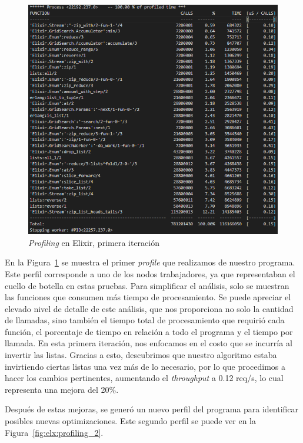 \documentclass[11pt]{article}
\newcommand{\english}[1]{\textit{#1}}
\begin{document}
\begin{figure}[ht]
    \centering
    \includegraphics[scale=0.4]{resources/distributed_systems/elixir/1.png}
    \caption{\english{Profiling} en Elixir, primera iteración}
    \label{fig:elx:profiling_1}
\end{figure}

En la Figura~\ref{fig:elx:profiling_1} se muestra el primer \english{profile} que realizamos de nuestro programa. Este perfil corresponde a uno de los nodos trabajadores, ya que representaban el cuello de botella en estas pruebas. Para simplificar el análisis, solo se muestran las funciones que consumen más tiempo de procesamiento. Se puede apreciar el elevado nivel de detalle de este análisis, que nos proporciona no solo la cantidad de llamadas, sino también el tiempo total de procesamiento que requirió cada función, el porcentaje de tiempo en relación a todo el programa y el tiempo por llamada. En esta primera iteración, nos enfocamos en el costo que se incurría al invertir las listas. Gracias a esto, descubrimos que nuestro algoritmo estaba invirtiendo ciertas listas una vez más de lo necesario, por lo que procedimos a hacer los cambios pertinentes, aumentando el \english{throughput} a 0.12 req/s, lo cual representa una mejora del 20\%.

Después de estas mejoras, se generó un nuevo perfil del programa para identificar posibles nuevas optimizaciones. Este segundo perfil se puede ver en la Figura~\ref{fig:elx:profiling_2}.
\end{document}
